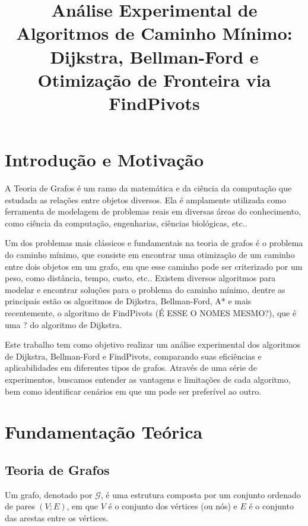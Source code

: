 \documentclass[10pt,a4paper]{article}
\title{\bfseries Análise Experimental de Algoritmos de Caminho Mínimo: Dijkstra, Bellman-Ford e Otimização de Fronteira via FindPivots}
\begin{document}
\maketitle




\section{Introdução e Motivação}

A Teoria de Grafos é um ramo da matemática e da ciência da computação que estudada as relações entre objetos diversos. Ela é amplamente utilizada como ferramenta de modelagem de problemas reais em diversas áreas do conhecimento, como ciência da computação, engenharias, ciências biológicas, etc..

Um dos problemas mais clássicos e fundamentais na teoria de grafos é o problema do caminho mínimo, que consiste em encontrar uma otimização de um caminho entre dois objetos em um grafo, em que esse caminho pode ser criterizado por um peso, como distância, tempo, custo, etc.. Existem diversos algoritmos para modelar e encontrar soluções para o problema do caminho mínimo, dentre as principais estão os algoritmos de Dijkstra, Bellman-Ford, A* e mais recentemente, o algoritmo de FindPivots (É ESSE O NOMES MESMO?), que é uma ? do algoritmo de Dijkstra.

Este trabalho tem como objetivo realizar um análise experimental dos algoritmos de Dijkstra, Bellman-Ford e FindPivots, comparando suas eficiências e aplicabilidades em diferentes tipos de grafos. Através de uma série de experimentos, buscamos entender as vantagens e limitações de cada algoritmo, bem como identificar cenários em que um pode ser preferível ao outro.

\section{Fundamentação Teórica}

\subsection{Teoria de Grafos}


Um grafo, denotado por $\mathcal{G}$, é uma estrutura composta por um conjunto ordenado de pares $\left(V;E\right) $, em que $V$ é o conjunto dos vértices (ou nós) e $E$ é o conjunto das arestas entre os vértices. 
\end{document}
